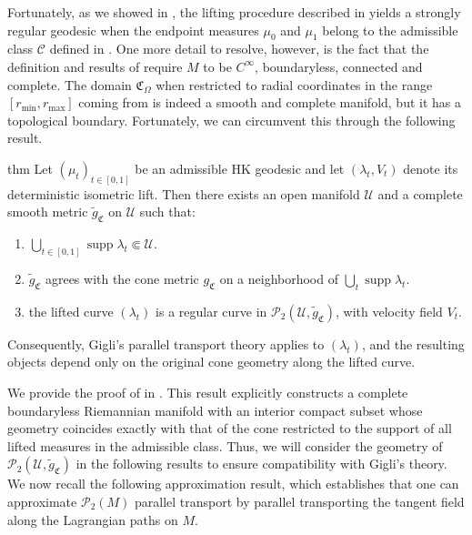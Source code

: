 \documentclass[11pt]{article}
\newcommand{\man}{M}
\begin{document}
Fortunately, as we showed in , the lifting procedure described in  yields a strongly regular geodesic when the endpoint measures $\mu_0$ and $\mu_1$ belong to the admissible class $\mathcal{C}$ defined in . One more detail to resolve, however, is the fact that the definition and results of \citet{gigli2012second} require $\man$ to be $C^\infty$, boundaryless, connected and complete. The domain $\mathfrak{C}_\Omega$ when restricted to radial coordinates in the range $[r_{\min}, r_{\max}]$ coming from  is indeed a smooth and complete manifold, but it has a topological boundary. Fortunately, we can circumvent this through the following result.  

\begin{restatable}{thm}{} \label{cone ambient manifold}
Let $(\mu_t)_{t\in[0,1]}$ be an admissible HK geodesic and let $(\lambda_t,V_t)$ denote its deterministic isometric lift.
Then there exists an open manifold $\mathcal U$ and a complete smooth metric $\widetilde g_{\mathfrak C}$ on $\mathcal U$
such that:
\begin{enumerate}
    \item $\bigcup_{t\in[0,1]} \operatorname{supp}\lambda_t \Subset \mathcal U$.
    \item $\widetilde g_{\mathfrak C}$ agrees with the cone metric $g_{\mathfrak C}$ on a neighborhood of
    $\bigcup_t \operatorname{supp}\lambda_t$.
    \item the lifted curve $(\lambda_t)$ is a regular curve in $\mathcal P_2(\mathcal U,\widetilde g_{\mathfrak C})$, with velocity field $V_t$.
\end{enumerate}
Consequently, Gigli's parallel transport theory applies to $(\lambda_t)$, and the resulting objects depend only on the original cone geometry along the lifted curve.
\end{restatable}

We provide the proof of  in . This result explicitly constructs a complete boundaryless Riemannian manifold with an interior compact subset whose geometry coincides exactly with that of the cone restricted to the support of all lifted measures in the admissible class. Thus, we will consider the geometry of $\mathcal{P}_2(\mathcal{U}, \tilde g_{\mathfrak{C}})$ in the following results to ensure compatibility with Gigli's theory. We now recall the following approximation result, which establishes that one can approximate $\mathcal{P}_2(\man)$ parallel transport by parallel transporting the tangent field along the Lagrangian paths on $\man$.
\end{document}
